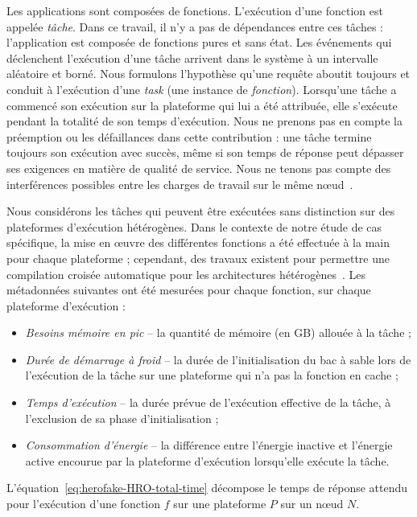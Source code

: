 Les applications sont composées de fonctions. L'exécution d'une fonction est appelée \textit{tâche}. Dans ce travail, il n'y a pas de dépendances entre ces tâches : l'application est composée de fonctions pures et sans état. Les événements qui déclenchent l'exécution d'une tâche arrivent dans le système à un intervalle aléatoire et borné. Nous formulons l'hypothèse qu'une requête aboutit toujours et conduit à l'exécution d'une \textit{task} (une instance de \textit{fonction}). Lorsqu'une tâche a commencé son exécution sur la plateforme qui lui a été attribuée, elle s'exécute pendant la totalité de son temps d'exécution. Nous ne prenons pas en compte la préemption ou les défaillances dans cette contribution : une tâche termine toujours son exécution avec succès, même si son temps de réponse peut dépasser ses exigences en matière de qualité de service. Nous ne tenons pas compte des interférences possibles entre les charges de travail sur le même nœud~\cite{dartoisInvestigatingMachineLearning2021}. 

Nous considérons les tâches qui peuvent être exécutées sans distinction sur des plateformes d'exécution hétérogènes. Dans le contexte de notre étude de cas spécifique, la mise en œuvre des différentes fonctions a été effectuée à la main pour chaque plateforme ; cependant, des travaux existent pour permettre une compilation croisée automatique pour les architectures hétérogènes~\cite{hortaXartrekRuntimeExecution2021, 10.1145/3445814.3446699}. Les métadonnées suivantes ont été mesurées pour chaque fonction, sur chaque plateforme d'exécution : 

\begin{itemize}
    \item \textit{Besoins mémoire en pic} -- la quantité de mémoire (en GB) allouée à la tâche ;
    \item \textit{Durée de démarrage à froid} -- la durée de l'initialisation du bac à sable lors de l'exécution de la tâche sur une plateforme qui n'a pas la fonction en cache ;
    \item \textit{Temps d'exécution} -- la durée prévue de l'exécution effective de la tâche, à l'exclusion de sa phase d'initialisation ;
    \item \textit{Consommation d'énergie} -- la différence entre l'énergie inactive et l'énergie active encourue par la plateforme d'exécution lorsqu'elle exécute la tâche.
\end{itemize}

L'équation~\ref{eq:herofake-HRO-total-time} décompose le temps de réponse attendu pour l'exécution d'une fonction $f$ sur une plateforme $P$ sur un nœud $N$.

